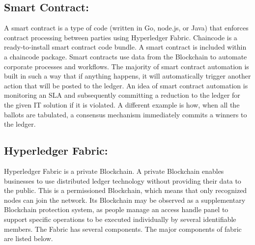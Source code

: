 \documentclass[12pt]{ucthesis}
\begin{document}
\subsection{Smart Contract:}
A smart contract is a type of code (written in Go, node.js, or Java) that enforces contract processing between parties using Hyperledger Fabric. Chaincode is a ready-to-install smart contract code bundle. A smart contract is included within a chaincode package. 
Smart contracts use data from the Blockchain to automate corporate processes and workflows\cite{rf18}. The majority of smart contract automation is built in such a way that if anything happens, it will automatically trigger another action that will be posted to the 
ledger. An idea of smart contract automation is monitoring an SLA and subsequently committing a reduction to the ledger for the given IT solution if it is violated. A different example is how, when all the ballots are tabulated, a consensus mechanism immediately commits a winners to the ledger.  

\subsection{Hyperledger Fabric:}
 Hyperledger Fabric is a private
Blockchain. A private Blockchain enables businesses to use distributed ledger technology without providing their data to the public. This is a permissioned Blockchain, which means that only recognized nodes can join the network\cite{rf4}. Its Blockchain may
be observed as a supplementary Blockchain protection system, as people manage an access handle panel to support specific operations to be executed individually by several identifiable members.
The Fabric has several components. The major components of fabric are listed below.
 
\end{document}
